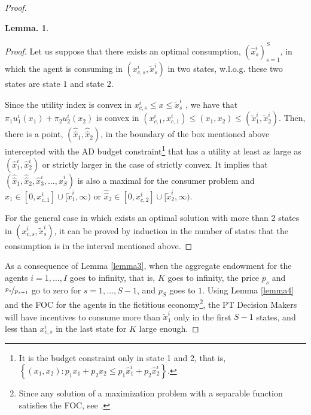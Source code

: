 \documentclass[pdftex]{article}
\numberwithin{equation}{section}
\theoremstyle{th}
\newtheorem{lemma}{{Lemma}.}%
\newtheorem{proof lemma}{{Proof Lemma}.}
\theoremstyle{definition}
\begin{document}
{\begin{proof}
\begin{lemma}
\end{lemma}

\begin{proof}

Let us suppose that there exists an optimal consumption, $\left(\hat{x}_{s}^{i}\right)_{s=1}^{S}$,
in which the agent is consuming in $\left(x_{c,s}^{i},\tilde{x}_{s}^{i}\right)$
in two states, w.l.o.g. these two states are state $1$ and state
$2$.

Since the utility index is convex in ${x}_{c,s}^{i}\leq{x}\leq\tilde{x}_{s}^{i}$
, we have that $\pi_{1}u_{1}^{i}\left(x_{1}\right)+\pi_{2}u_{2}^{i}\left(x_{2}\right)$
is convex in $\left(x_{c,1}^{i},x_{c,1}^{i}\right)\leq\left(x_{1},x_{2}\right)\leq\left(\tilde{x}_{1}^{i},\tilde{x}_{2}^{i}\right)$.
Then, there is a point, $\left(\hat{\hat{x}}_{1},\hat{\hat{x}}_{2}\right)$,
in the boundary of the box mentioned above intercepted with the AD
budget constraint\footnote{It is the budget constraint only in state 1 and 2, that is, $\left\{(x_1,x_2):p_{1}x_{1}+p_{2}x_{2}\leq{p}_{1}\hat{x}_{1}^{i}+p_{2}\hat{x}_{2}^{i}\right\}$.} that has a utility at least as large as $(\hat{x}_{1}^{i},\hat{x}_{2}^{i})$
or strictly larger in the case of strictly convex. It implies that
$\left(\hat{\hat{x}}_{1},\hat{\hat{x}}_{2},\hat{x}_{3}^{i},\dots,\hat{x}_{S}^{i}\right)$
is also a maximal for the consumer problem and $\hat{\hat{x}}_{1}\in[0,x_{c,1}^{i}]\cup[\tilde{x}_{1}^{i},\infty)$
or $\hat{\hat{x}}_{2}\in[0,x_{c,2}^{i}]\cup[\tilde{x}_{2}^{i},\infty)$. 

For the general case in which exists an optimal solution with more
than 2 states in $\left(x_{c,s}^{i},\tilde{x}_{s}^{i}\right)$, it
can be proved by induction in the number of states that the consumption
is in the interval mentioned above.

\end{proof}

As a consequence of Lemma \ref{lemma3}, when the aggregate endowment
for the agents $i=1,\dots,I$ goes to infinity, that is, $K$ goes to infinity, the price $p_{s}$
and $\nicefrac{p_{s}}{p_{s+1}}$ go to zero for $s=1,\dots,S-1$,
and $p_{S}$ goes to $1$. Using Lemma \ref{lemma4} and the FOC
for the agents in the fictitious economy\footnote{Since any solution of a maximization problem with a separable function
satisfies the FOC, see \cite{IS}.}, the PT Decision Makers will have incentives to consume more than
$\tilde{x}_{1}^{i}$ only in the first $S-1$ states, and less than
$x_{c,s}^{i}$ in the last state for $K$ large enough.



\end{proof}}
\end{document}
